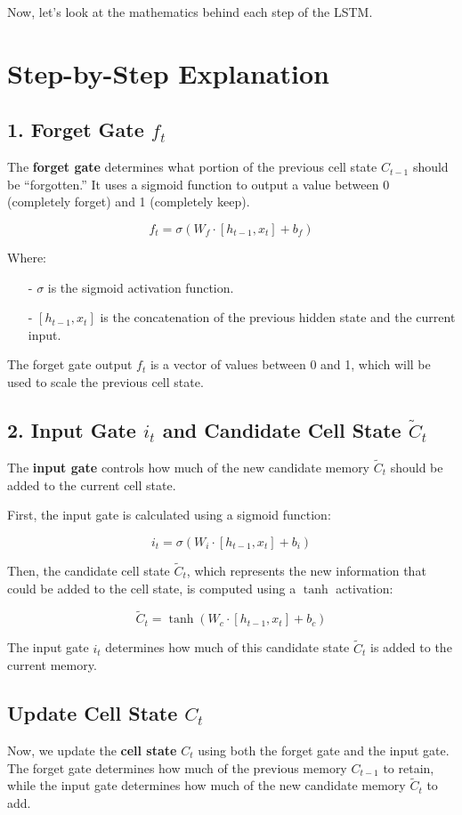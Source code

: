 \documentclass[10pt]{article}
\begin{document}
Now, let’s look at the mathematics behind each step of the LSTM.

\section{ Step-by-Step Explanation}

\subsection{ 1. Forget Gate \( f_t \)}
The {\bf forget gate} determines what portion of the previous cell state \( C_{t-1} \) should be “forgotten.” It uses a sigmoid function to output a value between 0 (completely forget) and 1 (completely keep).

\[
f_t = \sigma(W_f \cdot [h_{t-1}, x_t] + b_f)
\]

Where:
\begin{itemize}
   \item [-] \( \sigma \) is the sigmoid activation function.
   \item [-] \( [h_{t-1}, x_t] \) is the concatenation of the previous hidden state and the current input.
\end{itemize}



The forget gate output \( f_t \) is a vector of values between 0 and 1, which will be used to scale the previous cell state.

\subsection{ 2. Input Gate \( i_t \) and Candidate Cell State \( \tilde{C}_t \)}
The {\bf input gate} controls how much of the new candidate memory \( \tilde{C}_t \) should be added to the current cell state.

First, the input gate is calculated using a sigmoid function:

\[
i_t = \sigma(W_i \cdot [h_{t-1}, x_t] + b_i)
\]

Then, the candidate cell state \( \tilde{C}_t \), which represents the new information that could be added to the cell state, is computed using a \( \tanh \) activation:

\[
\tilde{C}_t = \tanh(W_c \cdot [h_{t-1}, x_t] + b_c)
\]

The input gate \( i_t \) determines how much of this candidate state \( \tilde{C}_t \) is added to the current memory.

\subsection{ Update Cell State \( C_t \)}
Now, we update the {\bf cell state} \( C_t \) using both the forget gate and the input gate. The forget gate determines how much of the previous memory \( C_{t-1} \) to retain, while the input gate determines how much of the new candidate memory \( \tilde{C}_t \) to add.
\end{document}
